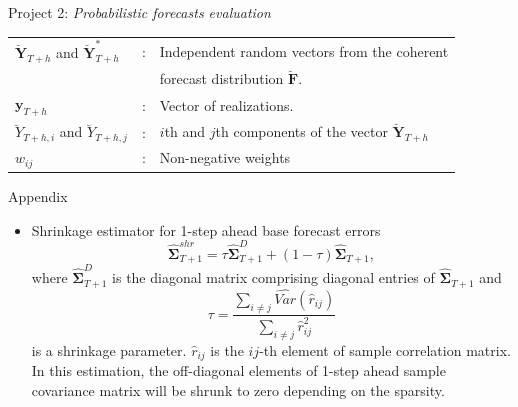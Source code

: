 \documentclass[11pt,xcolor=dvipsnames,handout]{beamer} %
\begin{document}
\begin{frame}[noframenumbering]{Project 2: \textit{Probabilistic forecasts evaluation}}
\begin{itemize}
	\begin{table}
		\small
		\centering %
		\begin{tabular}{lll}
			\toprule
			$\breve{\bm{Y}}_{T+h}$ and $\breve{\bm{Y}}^*_{T+h}$ & : & Independent random vectors from the coherent \\
			& & forecast distribution $\breve{\bm{F}}$.\\
			$\bm{y}_{T+h}$ & : &Vector of realizations. \\
			$\breve{Y}_{T+h,i}$ and $\breve{Y}_{T+h,j}$ & : & $i$th and $j$th components of the vector $\breve{\bm{Y}}_{T+h}$ \\
			$w_{ij}$ & : & Non-negative weights\\
			\bottomrule
		\end{tabular}
	\end{table}
	
\end{itemize}

\end{frame}


\begin{frame}[noframenumbering]{Appendix}
\begin{itemize}
	\item \hypertarget{Shrinkage}{} Shrinkage estimator for 1-step ahead base forecast errors
	$$
	\hat{\bm{\Sigma}}_{T+1}^{shr} = \tau\hat{\bm{\Sigma}}_{T+1}^D + (1-\tau)\hat{\bm{\Sigma}}_{T+1},
	$$
	where $\hat{\bm{\Sigma}}_{T+1}^D$ is the diagonal matrix comprising diagonal entries of $\hat{\bm{\Sigma}}_{T+1}$ and $$\tau = \frac{\sum_{i \ne j}\hat{Var}(\hat{r}_{ij})}{\sum_{i \ne j}\hat{r}_{ij}^2}$$ is a shrinkage parameter. $\hat{r}_{ij}$ is the $ij$-th element of sample correlation matrix.  In this estimation, the off-diagonal elements of 1-step ahead sample covariance matrix will be shrunk to zero depending on the sparsity.
	
\end{itemize}
\end{frame}
\end{document}
